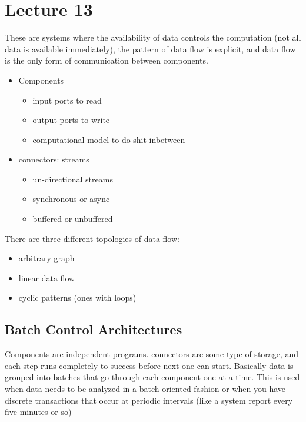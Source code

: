 \documentclass{article}
\begin{document}
\section*{Lecture 13} %
\label{sec:lecture_13}
These are systems where the availability of data controls the computation (not all data is available immediately), the pattern of data flow is explicit, and data flow is the only form of communication between components.

\begin{itemize}
    \item Components
    \begin{itemize}
        \item input ports to read
        \item output ports to write
        \item computational model to do shit inbetween
    \end{itemize}
    \item connectors: streams
    \begin{itemize}
        \item un-directional streams
        \item synchronous or async
        \item buffered or unbuffered
    \end{itemize}
\end{itemize}

There are three different topologies of data flow:
\begin{itemize}
    \item arbitrary graph
    \item linear data flow
    \item cyclic patterns (ones with loops)
\end{itemize}

\subsection*{Batch Control Architectures} %
\label{sub:batch_control_architectures}
Components are independent programs. connectors are some type of storage, and each step runs completely to success before next one can start. Basically data is grouped into batches that go through each component one at a time. This is used when data needs to be analyzed in a batch oriented fashion or when you have discrete transactions that occur at periodic intervals (like a system report every five minutes or so)
\end{document}
